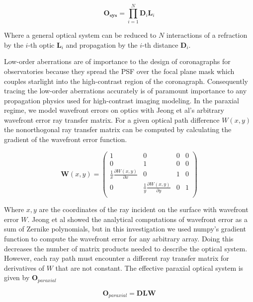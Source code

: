 \begin{equation}
    \mathbf{O_{sys}} = \prod_{i = 1}^{N} \mathbf{D}_{i} \mathbf{L}_{i}
\end{equation}

Where a general optical system can be reduced to $N$ interactions of a refraction by the $i$-th optic $\textbf{L}_{i}$ and propagation by the $i$-th distance $\textbf{D}_{i}$.

Low-order aberrations are of importance to the design of coronagraphs for observatories because they spread the PSF over the focal plane mask which couples starlight into the high-contrast region of the coronagraph. Consequently tracing the low-order aberrations accurately is of paramount importance to any propagation physics used for high-contrast imaging modeling. In the paraxial regime, we model wavefront errors on optics with Jeong et al's arbitrary wavefront error ray transfer matrix\cite{Jeong:05}. For a given optical path difference $W(x,y)$ the nonorthogonal ray transfer matrix can be computed by calculating the gradient of the wavefront error function.

\begin{equation}
    \mathbf{W}(x,y) = 
    \begin{pmatrix}
    1 & 0 & 0 & 0 \\
    0 & 1 & 0 & 0 \\
    \frac{1}{x}\frac{\partial W(x,y)}{\partial x}& 0 & 1 & 0 \\
    0 & \frac{1}{y}\frac{\partial W(x,y)}{\partial y} & 0 & 1 \\
    \end{pmatrix}
\end{equation}

Where $x,y$ are the coordinates of the ray incident on the surface with wavefront error $W$. Jeong et al showed the analytical computations of wavefront error as a sum of Zernike polynomials, but in this investigation we used numpy's gradient function to compute the wavefront error for any arbitrary array. Doing this decreases the number of matrix products needed to describe the optical system. However, each ray path must encounter a different ray transfer matrix for derivatives of $W$ that are not constant. The effective paraxial optical system is given by $\mathbf{O}_{paraxial}$

\begin{equation}
    \mathbf{O}_{paraxial} = \mathbf{D}\mathbf{L}\mathbf{W}
\end{equation}


